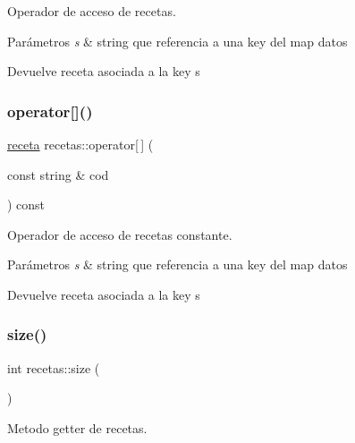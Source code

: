 Operador de acceso de recetas. 


\begin{DoxyParams}{Parámetros}
{\em s} & string que referencia a una key del map datos \\
\hline
\end{DoxyParams}
\begin{DoxyReturn}{Devuelve}
receta asociada a la key s 
\end{DoxyReturn}
\mbox{\label{classrecetas_a746208f984694cc8d24c09fd01ad234b}} 
\subsubsection{\texorpdfstring{operator[]()}{operator[]()}\hspace{0.1cm}{\footnotesize\ttfamily [2/2]}}
{\footnotesize\ttfamily \hyperlink{classreceta}{receta} recetas\+::operator\mbox{[}$\,$\mbox{]} (\begin{DoxyParamCaption}\item[{const string \&}]{cod }\end{DoxyParamCaption}) const}



Operador de acceso de recetas constante. 


\begin{DoxyParams}{Parámetros}
{\em s} & string que referencia a una key del map datos \\
\hline
\end{DoxyParams}
\begin{DoxyReturn}{Devuelve}
receta asociada a la key s 
\end{DoxyReturn}
\mbox{\label{classrecetas_a9d208c157f2dc674b48e11d359de911a}} 
\subsubsection{\texorpdfstring{size()}{size()}}
{\footnotesize\ttfamily int recetas\+::size (\begin{DoxyParamCaption}{ }\end{DoxyParamCaption})}



Metodo getter de recetas. 

